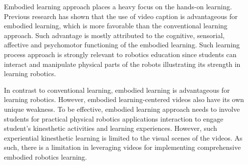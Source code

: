 
Embodied learning approach places a heavy focus on the hands-on learning. Previous research has shown that the use of video caption is advantageous for embodied learning, which is more favorable than the  conventional learning approach. Such advantage is mostly attributed to the cognitive, sensorial, affective and psychomotor functioning of the embodied learning.  Such learning process approach is strongly relevant to robotics education since students can interact and manipulate physical parts of the robots illustrating its strength in learning robotics. 

In contrast to conventional learning, embodied learning is advantageous for learning robotics. However, embodied learning-centered videos also have its own unique weakness. To be effective, embodied learning approach needs to involve students for practical physical robotics applications interaction to engage student's kinesthetic activities and learning experiences. However, such experiential kinesthetic learning is limited to the visual scenes of the videos. As such, there is a limitation in leveraging videos for implementing comprehensive embodied robotics learning.      


